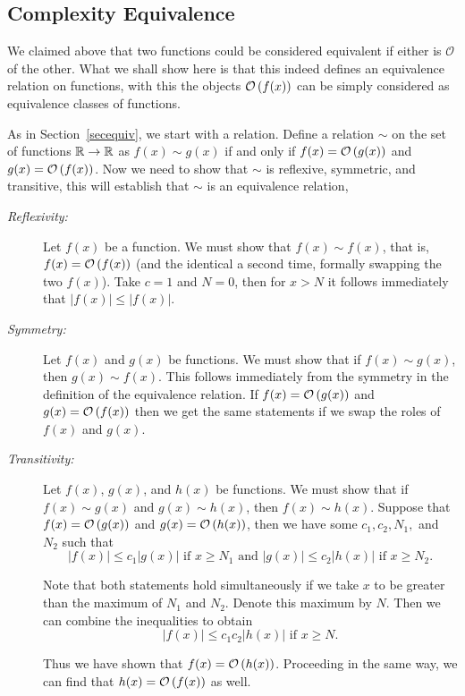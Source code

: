 \subsection{Complexity Equivalence}
\label{equivcomp}

We claimed above that two functions could be considered equivalent if
either is $\mathcal{O}$ of the other. What we shall show here is that this
indeed defines an equivalence relation on functions, with this the objects
${\mathcal O}\/\left(f(x)\right)$ can be simply considered as equivalence classes of functions.

As in Section~\ref{secequiv}, we start with a relation.
Define a relation $\sim$ on the set of functions ${\mathbb R}\to{\mathbb R}$ as $f(x)\sim g(x)$
if and only if $f(x) = {\mathcal O}\/\left(g(x)\right)$ and $g(x) = {\mathcal O}\/\left(f(x)\right)$. Now
we need to show that $\sim$ is reflexive, symmetric, and transitive, this
will establish that $\sim$ is an equivalence relation,

\begin{description}
\item[\textit{Reflexivity:}] Let $f(x)$ be a function. We must show that $f(x)\sim
f(x)$, that is, $f(x) = {\mathcal O}\/\left(f(x)\right)$ (and the identical a second time,
formally swapping the two $f(x)$).
Take $c=1$ and $N=0$, then for $x>N$ it follows immediately that $|f(x)| \leq |f(x)|$.

\item[\textit{Symmetry:}] Let $f(x)$ and $g(x)$ be functions. We must show that if $f(x) \sim g(x)$, then $g(x) \sim f(x)$.
This follows immediately from the symmetry in the definition of the equivalence relation.
If $f(x) = {\mathcal O}\/\left(g(x)\right)$ and $g(x) = {\mathcal O}\/\left(f(x)\right)$
then we get the same statements if we swap the roles of $f(x)$ and $g(x)$.

\item[\textit{Transitivity:}] Let $f(x)$, $g(x)$, and $h(x)$ be functions. We must show that
if $f(x) \sim g(x)$ and $g(x)\sim h(x)$, then $f(x)\sim h(x)$. Suppose that
$f(x) = {\mathcal O}\/\left(g(x)\right)$
and $g(x) = {\mathcal O}\/\left(h(x)\right)$, then we have some $c_1,c_2,N_1,$ and $N_2$ such that
\[
	|f(x)|\leq c_1|g(x)| \text{ if } x\geq N_1 \text{ and } |g(x)|\leq c_2|h(x)| \text{ if } x \geq N_2.
\]

Note that both statements hold simultaneously if we take $x$ to be greater than the maximum of $N_1$ and $N_2$. Denote
this maximum by $N$. Then we can combine the inequalities to obtain
\[
	|f(x)|\leq c_1 c_2|h(x)| \text{ if } x \geq N.
\]

Thus we have shown that $f(x) = {\mathcal O}\/\left(h(x)\right)$. Proceeding in the same way, we can
find that $h(x) = {\mathcal O}\/\left(f(x)\right)$ as well.
\end{description}

